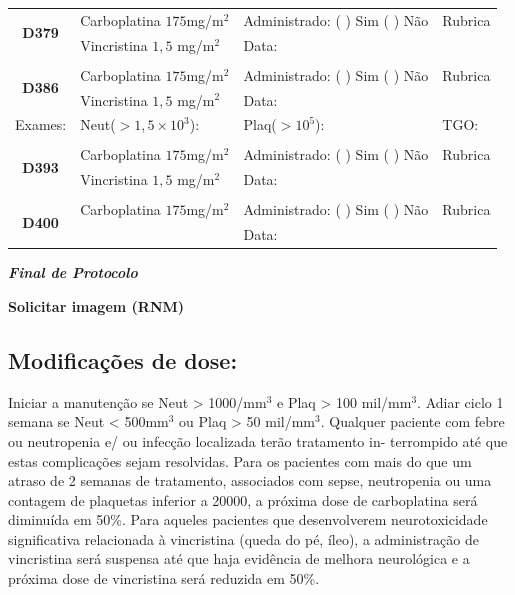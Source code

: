 \documentclass[11pt,a4paper,oldfontcommands]{memoir}
\begin{document}
\begin{center}
\begin{table}[H]
\begin{tabular}{p{1.3cm}p{4.9cm}|p{4.7cm}|p{3cm}}
    \hline
    \multicolumn{1}{c|}{\multirow{2}{*}{\textbf{D379}}}&{Carboplatina \(175\)mg/m\(^2\)}&{Administrado: (  ) Sim (  ) Não}&{Rubrica}\\
    \multicolumn{1}{c|}{}&{Vincristina \(1,5\) mg/m\(^2\)}&{Data:}&\\
    \hline
    \\
    \hline
    \multicolumn{1}{c|}{\multirow{2}{*}{\textbf{D386}}}&{Carboplatina \(175\)mg/m\(^2\)}&{Administrado: (  ) Sim (  ) Não}&{Rubrica}\\
    \multicolumn{1}{c|}{}&{Vincristina \(1,5\) mg/m\(^2\)}&{Data:}&\\
    \hline
{Exames:}&{Neut(\(>1,5\times10^3\)):}&{Plaq(\(>10^5\)):}&{TGO:}
    \\
    \hline
    \\
    \hline
    \multicolumn{1}{c|}{\multirow{2}{*}{\textbf{D393}}}&{Carboplatina \(175\)mg/m\(^2\)}&{Administrado: (  ) Sim (  ) Não}&{Rubrica}\\
    \multicolumn{1}{c|}{}&{Vincristina \(1,5\) mg/m\(^2\)}&{Data:}&\\
    \hline
    \\
    \hline
    \multicolumn{1}{c|}{\multirow{2}{*}{\textbf{D400}}}&{Carboplatina \(175\)mg/m\(^2\)}&{Administrado: (  ) Sim (  ) Não}&{Rubrica}\\
	\multicolumn{1}{c|}{}&&{Data:}&\\
    \hline
\end{tabular}
\end{table}

\textbf{\textit{Final de Protocolo}}

\textbf{Solicitar imagem (RNM)}

\end{center}

\subsection{Modificações de dose:}
Iniciar a manutenção se Neut > 1000/mm\(^3\) e Plaq > 100 mil/mm\(^3\). Adiar ciclo 1 semana se Neut < 500mm\(^3\) ou Plaq > 50 mil/mm\(^3\). Qualquer paciente com febre ou neutropenia e/ ou infecção localizada terão tratamento in- terrompido até que estas complicações sejam resolvidas. Para os pacientes com mais do que um atraso de 2 semanas de tratamento, associados com sepse, neutropenia ou uma contagem de plaquetas inferior a 20000, a próxima dose de carboplatina será diminuída em 50\%. Para aqueles pacientes que desenvolverem neurotoxicidade significativa relacionada à vincristina  (queda do pé, íleo), a administração de vincristina será suspensa até que haja evidência de melhora neurológica e a próxima dose de vincristina será reduzida em 50\%.
\end{document}

